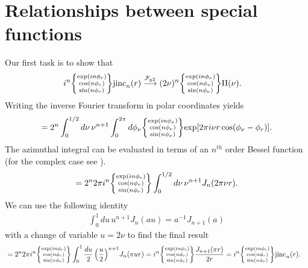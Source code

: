 \documentclass[]{osa-article}
\let\originalleft\left
\let\originalright\right
\renewcommand{\left}{\mathopen{}\mathclose\bgroup\originalleft}
\renewcommand{\right}{\aftergroup\egroup\originalright}
\providecommand{\mbb}[1]{\mathbb{#1}}
\begin{document}
\section{Relationships between special functions} \label{sec:special}
Our first task is to show that 
\begin{align}
  i^{n}\left\{\substack{
  \text{exp}(in\phi_r)\\
    \cos(n\phi_r)\\
    \sin(n\phi_r)
  }\right\}\text{jinc}_{n}(r) &\stackrel{\mathcal{F}_{\mbb{R}^2}}{\longrightarrow}   (2\nu)^{n}\left\{\substack{
    \text{exp}(in\phi_{\nu})\\
    \cos(n\phi_{\nu})\\
    \sin(n\phi_{\nu})
  }\right\}\Pi(\nu). \label{eq:jincrect3}
  \end{align}
  Writing the inverse Fourier transform in polar coordinates yields
  \begin{align}
    =2^n\int_0^{1/2}d\nu\, \nu^{n+1}\int_0^{2\pi}d\phi_\nu\left\{\substack{
    \text{exp}(in\phi_{\nu})\\
    \cos(n\phi_{\nu})\\
    \sin(n\phi_{\nu})
  }\right\}\text{exp}[2\pi i\nu r\cos(\phi_\nu - \phi_r)].
  \end{align}
  The azimuthal integral can be evaluated in terms of an $n^{th}$ order Bessel
  function (for the complex case see \cite[ch. 4.111]{barrett2004}).
  \begin{align}
    =2^n 2\pi i^n \left\{\substack{
    \text{exp}(in\phi_{r})\\
    \cos(n\phi_r)\\
    \sin(n\phi_r)
  }\right\}\int_0^{1/2}d\nu\, \nu^{n+1}J_n(2\pi\nu r).
  \end{align}
  We can use the following identity \cite[ch.~6.561-5]{gradshteyn2007}
  \begin{align}
    \int_0^1 du\, u^{n + 1}J_{n}(au) = a^{-1}J_{n + 1}(a)
  \end{align}
  with a change of variable $u = 2\nu$ to find the final result
  \begin{align}
    &=2^n 2\pi i^n \left\{\substack{
    \text{exp}(in\phi_{r})\\
    \cos(n\phi_r)\\
    \sin(n\phi_r)
  }\right\}\int_0^{1}\frac{du}{2}\, \left(\frac{u}{2}\right)^{n+1}J_n(\pi u r)
    =i^n \left\{\substack{
    \text{exp}(in\phi_{r})\\
    \cos(n\phi_r)\\
    \sin(n\phi_r)
  }\right\}\frac{J_{n+1}(\pi r)}{2r}
    =i^n \left\{\substack{
    \text{exp}(in\phi_{r})\\
    \cos(n\phi_r)\\
    \sin(n\phi_r)
  }\right\}\text{jinc}_{n}(r).
  \end{align}
\end{document}
